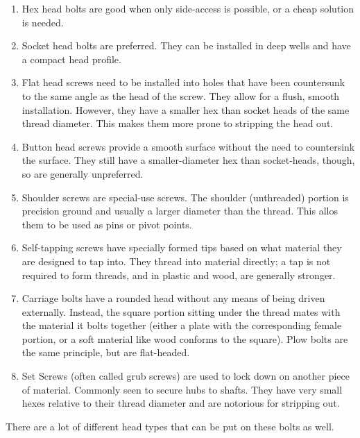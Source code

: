 \documentclass[10pt,letterpaper]{book}
\begin{document}
	\begin{enumerate}[label=\alph*]
		\item Hex head bolts are good when only side-access is possible, or a cheap solution is needed.
		\item Socket head bolts are preferred. They can be installed in deep wells and have a compact head profile.
		\item Flat head screws need to be installed into holes that have been countersunk to the same angle as the head of the screw. They allow for a flush, smooth installation. However, they have a smaller hex than socket heads of the same thread diameter. This makes them more prone to stripping the head out.
		\item Button head screws provide a smooth surface without the need to countersink the surface. They still have a smaller-diameter hex than socket-heads, though, so are generally unpreferred.
		\item Shoulder screws are special-use screws. The shoulder (unthreaded) portion is precision ground and usually a larger diameter than the thread. This allos them to be used as pins or pivot points.
		\item Self-tapping screws have specially formed tips based on what material they are designed to tap into. They thread into material directly; a tap is not required to form threads, and in plastic and wood, are generally stronger.
		\item Carriage bolts have a rounded head without any means of being driven externally. Instead, the square portion sitting under the thread mates with the material it bolts together (either a plate with the corresponding female portion, or a soft material like wood conforms to the square). Plow bolts are the same principle, but are flat-headed.
		\item Set Screws (often called grub screws) are used to lock down on another piece of material. Commonly seen to secure hubs to shafts. They have very small hexes relative to their thread diameter and are notorious for stripping out.
	\end{enumerate}
	
	There are a lot of different head types that can be put on these bolts as well. 
	
\end{document}

